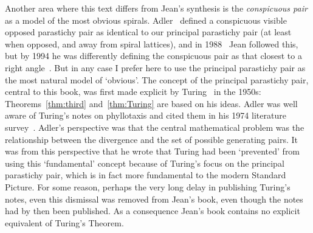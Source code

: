 Another area where this text differs from Jean's synthesis is the \emph{conspicuous pair} as a model of the most obvious spirals. Adler~\cite{adlerModelContactPressure1974} defined a conspicuous visible opposed parastichy pair as identical to our principal parastichy pair (at least when opposed, and away from spiral lattices), and in 1988~\cite[p214]{jeanNumbertheoreticPropertiesTwodimensional1988} Jean followed this, but by 1994 he was differently defining the conspicuous pair as that closest to a right angle~\cite[p18]{jeanPhyllotaxisSystemicStudy1994}. But in any case 
I prefer here to use the principal parastichy pair as the most natural model of `obvious'. 
The concept of the principal parastichy pair, central to this book, was first made explicit by Turing~\autocite{turingMorphogenTheoryPhyllotaxis2013} in the 1950s: Theorems~\ref{thm:third} and~\ref{thm:Turing} are based on his ideas. Adler was well aware of Turing's notes on phyllotaxis and cited them in his 1974 literature survey~\cite{adlerModelContactPressure1974}. Adler's perspective was that the central mathematical problem was the relationship between the divergence and the set of possible generating pairs. It was from this perspective that he wrote that Turing had been `prevented' from using this `fundamental' concept because of Turing's focus on the principal parastichy pair, which is in fact more fundamental to the modern Standard Picture. For some reason, perhaps the very long delay in publishing Turing's notes, even this dismissal was removed from Jean's book, even though the notes had by then been published. As a consequence Jean's book contains no explicit equivalent of Turing's Theorem. 

 \clearpage
